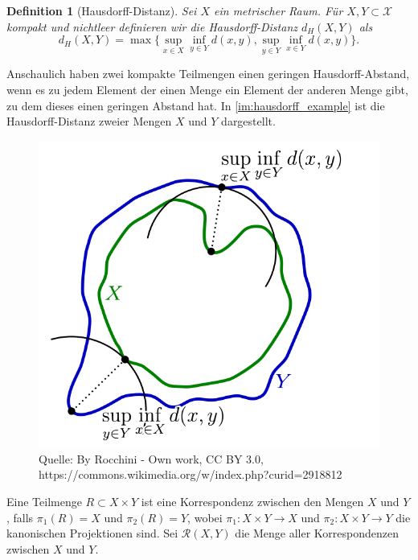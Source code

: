 \documentclass[11pt,a4paper]{article}
\newcommand{\source}[1]{\caption*{\hfill Quelle: {#1}} }
\def\emph#1{\textit{#1}}
\newtheorem{definition}[theorem]{Definition}
\numberwithin{equation}{section}
\begin{document}
	\begin{definition}[Hausdorff-Distanz]
		Sei $X$ ein metrischer Raum.
		Für  $X,Y \subset \mathscr{X}$ kompakt und nichtleer definieren wir die \emph{Hausdorff-Distanz} $d_H(X,Y)$ als
		\begin{equation}
		d_H(X,Y) = \max \lbrace \sup_{x \in X} \inf_{y \in Y} d(x,y), \sup_{y \in Y} \inf_{x \in Y} d(x,y) \rbrace .
		\end{equation} 
		
	\end{definition}
	Anschaulich haben zwei kompakte Teilmengen einen geringen Hausdorff-Abstand, wenn es zu jedem Element der einen Menge ein Element der anderen Menge gibt, zu dem dieses einen geringen Abstand hat. In \autoref{im:hausdorff_example} ist die Hausdorff-Distanz zweier Mengen $X$ und $Y$ dargestellt.
	
	\begin{figure}[!ht]
		\centering
		\includegraphics[width=0.3\textheight]{Hausdorff_distance.png}
		\caption{Visualisierung der Hausdorff-Distanz zwischen den Mengen $X$ und $Y$ in $\mathbb{R}^2$.}
		\source{By Rocchini - Own work, CC BY 3.0, https://commons.wikimedia.org/w/index.php?curid=2918812}
		\label{im:hausdorff_example}
	\end{figure}
	
	
	Eine Teilmenge $R \subset X \times Y$ ist eine Korrespondenz zwischen den Mengen $X$ und $Y$, falls $\pi_1(R) = X$ und $\pi_2(R) = Y$, wobei $\pi_1: X \times Y \to X$ und $\pi_2: X \times Y \to Y$ die kanonischen Projektionen sind. Sei $\mathcal{R}(X,Y)$ die Menge aller Korrespondenzen zwischen $X$ und $Y$.
	
\end{document}
